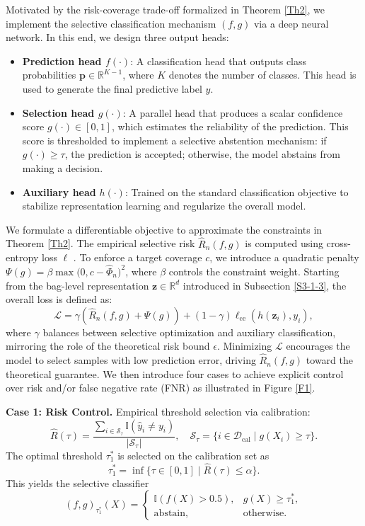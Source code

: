\documentclass[journal]{IEEEtran}
\theoremstyle{remark}
\begin{document}
Motivated by the risk-coverage trade-off formalized in Theorem \ref{Th2}, we implement the selective classification mechanism $(f,g)$ via a deep neural network. In this end, we design three output heads:

\begin{itemize}
\item \textbf{Prediction head $f(\cdot)$}: A classification head that outputs class probabilities $\mathbf{p} \in \mathbb{R}^{K-1}$, where $K$ denotes the number of classes. This head is used to generate the final predictive label $\hat{y}$.
\item \textbf{Selection head $g(\cdot)$}: A parallel head that produces a scalar confidence score $g(\cdot) \in [0,1]$, which estimates the reliability of the prediction. This score is thresholded to implement a selective abstention mechanism: if $g(\cdot) \ge \tau$, the prediction is accepted; otherwise, the model abstains from making a decision.
\item \textbf{Auxiliary head} $h(\cdot)$: Trained on the standard classification objective to stabilize representation learning and regularize the overall model.
\end{itemize}

We formulate a differentiable objective to approximate the constraints in Theorem \ref{Th2}. The empirical selective risk $\hat{R}_n(f,g)$ is computed using cross-entropy loss $\ell$ \cite{geifman2019selectivenet}. To enforce a target coverage $c$, we introduce a quadratic penalty $\Psi(g) = \beta \max\big(0, c - \hat{\Phi}_n \big)^2$, where $\beta$ controls the constraint weight. Starting from the bag-level representation $\mathbf{z} \in \mathbb{R}^d$ introduced in Subsection \ref{S3-1-3}, the overall loss is defined as:
\begin{equation*}
    \mathcal{L} = \gamma \left(\hat{R}_n(f,g) + \Psi(g)\right) + (1-\gamma) \ell_{\mathrm{ce}}(h(\mathbf{z}_i), y_i),
\end{equation*}
where $\gamma$ balances between selective optimization and auxiliary classification, mirroring the role of the theoretical risk bound $\epsilon$. Minimizing $\mathcal{L}$ encourages the model to select samples with low prediction error, driving $\hat{R}_n(f,g)$ toward the theoretical guarantee. We then introduce four cases to achieve explicit control over risk and/or false negative rate (FNR) as illustrated in Figure \ref{F1}.

\textbf{Case 1: Risk Control.}
Empirical threshold selection via calibration:
\[
\hat{R}(\tau)=\frac{\sum_{i\in\mathcal{S}_\tau}\mathbb{I}(\hat{y}_i \neq y_i)}{|\mathcal{S}_\tau|},
\quad
\mathcal{S}_\tau=\{i\in\mathcal{D}_{\mathrm{cal}}\mid g(X_i)\geq \tau\}.
\]
The optimal threshold $\tau_{1}^*$ is selected on the calibration set as
\begin{equation}\label{Eq1}
    \tau_{1}^*=\inf\{\tau \in[0,1]\mid\hat{R}(\tau)\leq\alpha\}.
\end{equation}
This yields the selective classifier
\[
(f,g)_{\tau_{1}^*}(X)=
\begin{cases}
\mathbb{I}\!\left(f(X)>0.5\right), & g(X)\geq \tau_{1}^*,\\[4pt]
\text{abstain}, & \text{otherwise}.
\end{cases}
\]
\end{document}
